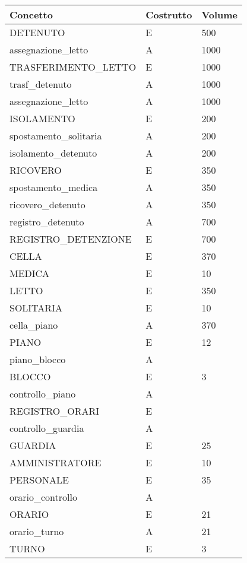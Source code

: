 \documentclass[a4paper,12pt]{report}
\begin{document}
\begin{table}[H]
\begin{tabular}{lll}
\hline
Concetto & Costrutto & Volume \\ \hline
DETENUTO & E & 500 \\
assegnazione\_letto & A &  1000\\
TRASFERIMENTO\_LETTO & E &  1000 \\
trasf\_detenuto & A & 1000 \\
assegnazione\_letto & A & 1000\\
ISOLAMENTO & E & 200\\
spostamento\_solitaria & A & 200\\
isolamento\_detenuto & A & 200 \\
RICOVERO & E & 350 \\
spostamento\_medica & A & 350 \\
ricovero\_detenuto & A & 350 \\
registro\_detenuto & A & 700 \\
REGISTRO\_DETENZIONE & E & 700 \\
CELLA & E & 370 \\
MEDICA & E & 10\\
LETTO & E & 350 \\
SOLITARIA & E & 10 \\
cella\_piano & A & 370 \\
PIANO & E & 12 \\
piano\_blocco & A & \\
BLOCCO & E & 3 \\
controllo\_piano & A & \\
REGISTRO\_ORARI & E & \\
controllo\_guardia & A & \\
GUARDIA & E & 25 \\
AMMINISTRATORE & E & 10 \\
PERSONALE & E & 35 \\
orario\_controllo & A & \\
ORARIO & E & 21 \\
orario\_turno & A & 21 \\
TURNO & E & 3 \\
\end{tabular}
\end{table}
\end{document}
